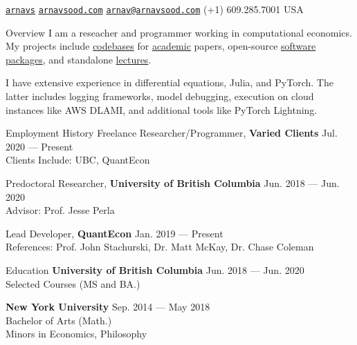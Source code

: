 \documentclass{resume} %
\begin{document}
 \href{https://github.com/arnavs}{\tt arnavs} \vline \hspace{0.5 em} {} \href{https://arnavsood.com}{\tt arnavsood.com} \vline \hspace{0.5 em} {} \href{mailto:arnav@arnavsood.com}{\tt arnav@arnavsood.com} \vline \hspace{0.5 em}  (+1) 609.285.7001 \vline \hspace{0.5 em}  USA 

\begin{rSection}{Overview}
   I am a reseacher and programmer working in computational economics. My projects include \href{https://github.com/jlperla/PerlaTonettiWaugh.jl}{codebases} for \href{https://github.com/jlperla/KnowledgeDiffusionSimulations.jl}{academic} papers, open-source \href{https://github.com/quantecon/expectations.jl}{software} \href{https://github.com/quantecon/instantiatefromurl.jl}{packages}, and standalone \href{https://datascience.quantecon.org/applications/recidivism.html}{lectures}. 
   
   I have extensive experience in differential equations, Julia, and PyTorch. The latter includes logging frameworks, model debugging, execution on cloud instances like AWS DLAMI, and additional tools like PyTorch Lightning.
\end{rSection}

\begin{rSection}{Employment History}
Freelance Researcher/Programmer, {\bf Varied Clients} \hfill {Jul. 2020 --- Present} 
\\ Clients Include: UBC, QuantEcon \smallskip 
    
Predoctoral Researcher, {\bf University of British Columbia} \hfill {Jun. 2018 --- Jun. 2020} 
\\ Advisor: Prof. Jesse Perla \smallskip 

Lead Developer, {\bf QuantEcon} \hfill {Jan. 2019 --- Present}
\\ References: Prof. John Stachurski, Dr. Matt McKay, Dr. Chase Coleman
\end{rSection}

\begin{rSection}{Education}
{\bf University of British Columbia} \hfill {Jun. 2018 --- Jun. 2020} 
\\ Selected Courses (MS and BA.)  %

{\bf New York University} \hfill {Sep. 2014 --- May 2018} 
\\ Bachelor of Arts (Math.) %
\\ Minors in Economics, Philosophy 
\end{rSection}
\end{document}
